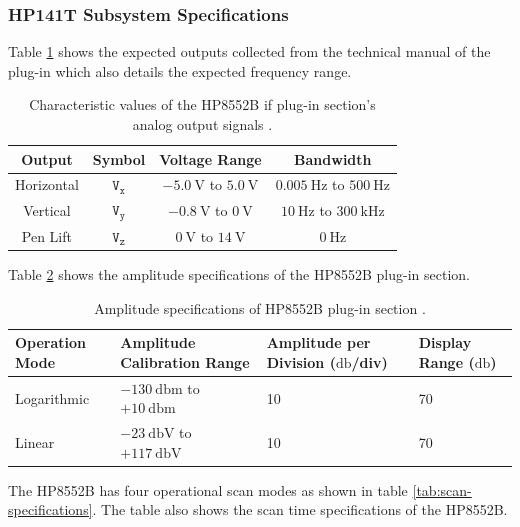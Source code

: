\documentclass[class=report,11pt,crop=false]{standalone}
\begin{document}
	\subsubsection{HP141T Subsystem Specifications}
	
	Table \ref{tab:hp8552b-output-vals} shows the expected outputs collected from the technical manual of the plug-in which also details the expected frequency range. 
	\begin{table}[ht!]
		\centering
		\label{tab:hp8552b-output-vals}
		\begin{tabular}{|c|c|c|c|}
			\hline
			\textbf{Output}	& \textbf{Symbol}& \textbf{Voltage Range}	& \textbf{Bandwidth} \\
			\hline
			Horizontal & $\texttt{V}_\texttt{x}$	& $-\SI{5.0}{\volt}$ to $\SI{+5.0}{\volt}$	& $\SI{0.005}{\hertz}$ to $\SI{500}{\hertz}$\\
			\hline
			Vertical & $\texttt{V}_\texttt{y}$	& $-\SI{0.8}{\volt}$ to $\SI{0}{\volt}$	& $\SI{10}{\hertz}$ to $\SI{300}{\kilo\hertz}$\\
			\hline
			Pen Lift & $\texttt{V}_\texttt{z}$  & $\SI{0}{\volt}$ to $\SI{14}{\volt}$  & $\SI{0}{\hertz}$\\
			\hline
		\end{tabular}
		\caption{Characteristic values of the HP8552B \acrshort{if} plug-in section's analog output signals \cite{hp8552b}.}
	\end{table}

	Table \ref{tab:hp8552b-amplitude-specs} shows the amplitude specifications of the HP8552B plug-in section. 
	
	\begin{table}[ht!]
		\centering
		\label{tab:hp8552b-amplitude-specs}
		\begin{tabular}{|m{8em}|m{10em}|m{8em}|m{8em}|}
			\hline
			\textbf{Operation Mode}	& \textbf{Amplitude Calibration Range} & \textbf{Amplitude per Division} ($\si{\decibel}$/div)	& \textbf{Display Range} ($\si{\decibel}$)\\
			\hline
			Logarithmic & $-\SI{130}{\decibel}\text{m}$	to $+\SI{10}{\decibel}\text{m}$ & 10 & 70	\\
			\hline
			Linear & $-\SI{23}{\decibel\volt}$	to $+\SI{117}{\decibel\volt}$ 	& 10 & 70\\
			\hline
		\end{tabular}
		\caption{Amplitude specifications of HP8552B plug-in section \cite{hp8552b}.}
	\end{table}

	The HP8552B has four operational scan modes as shown in table \ref{tab:scan-specifications}. The table also shows the scan time specifications of the HP8552B. 
	
\end{document}
